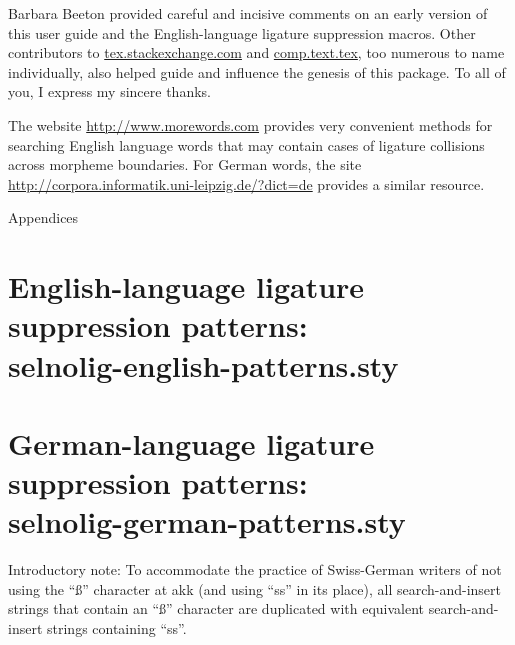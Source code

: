 \documentclass[11pt]{article}
\newcommand{\pkg}[1]{\textsf{#1}}
\let\oldappendix\appendix
\renewcommand\appendix{%
   \addtocontents{toc}{\protect{\vspace{1\baselineskip}}}
   \addtocontents{toc}{\protect{\mdseries Appendices\par}}
   \noindent
   {\Large Appendices}
   \oldappendix}
\begin{document}
Barbara Beeton provided careful and incisive comments on an early version of this user guide and the English-language ligature suppression macros. Other contributors to \url{tex.stackexchange.com} and \url{comp.text.tex}, too numerous to name individually, also helped guide and influence the genesis of this package. To all of you, I express my sincere thanks.

The website \url{http://www.morewords.com} provides very convenient methods for searching English language words that may contain cases of ligature collisions across morpheme boundaries. For German words, the site \url{http://corpora.informatik.uni-leipzig.de/?dict=de} provides a similar resource. 



\clearpage
\appendix
\selnoligoff  %

\small


\section[English-language ligature suppression patterns: selnolig-english-patterns.sty]{English-language ligature suppression patterns: \\ 
\pkg{selnolig-english-patterns.sty}}
\label{sec:eng-listing}

\begin{multicols}{2}
\end{multicols}

\clearpage
\section[German-language ligature suppression patterns:
selnolig-german-patterns.sty]{German-language ligature suppression patterns: \\ 
\pkg{selnolig-german-patterns.sty}}
\label{sec:germ-listing}

Introductory note: To accommodate the practice of Swiss-German writers of not using the \enquote{ß} character at akk (and using \enquote{ss} in its place), all search-and-insert strings that contain an \enquote{ß} character are duplicated with equivalent search-and-insert strings containing \enquote{ss}.

\bigskip

\begin{multicols}{2}
\end{multicols}
\end{document}
